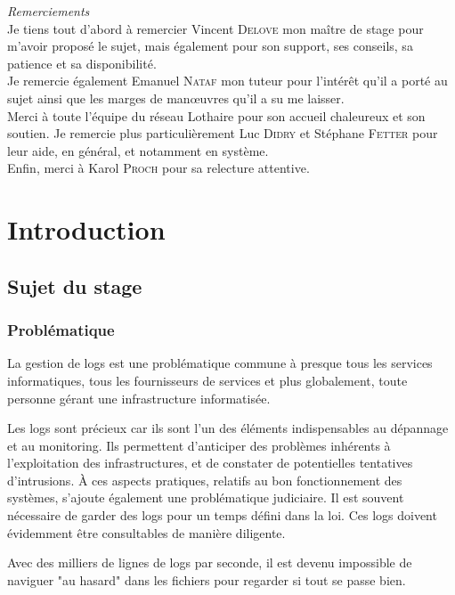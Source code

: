 \documentclass[a4paper,12pt,one side,titlepage]{report}
\begin{document}




\emph{\Large Remerciements}
\\[2cm]
Je tiens tout d'abord à remercier Vincent \textsc{Delove} mon maître de stage pour 
m'avoir proposé le sujet, mais également pour son support, ses conseils, sa patience
et sa disponibilité.
\\[2cm]
Je remercie également Emanuel \textsc{Nataf} mon tuteur pour l'intérêt qu'il a porté au 
sujet ainsi que les marges de manœuvres qu'il a su me laisser.
\\[1cm]
Merci à toute l'équipe du réseau Lothaire pour son accueil chaleureux et son soutien.
Je remercie plus particulièrement  Luc \textsc{Didry} et Stéphane \textsc{Fetter} pour leur
aide, en général, et  notamment en système.
\\[1cm]
Enfin, merci à Karol \textsc{Proch} pour sa relecture attentive.
\setcounter{tocdepth}{1}
\tableofcontents

\part{Introduction}

\chapter{Sujet du stage}
\section{Problématique}
La gestion de \gls{logs} est une problématique commune à presque tous les services informatiques,
tous les fournisseurs de services et plus globalement, toute personne gérant une infrastructure 
informatisée.

Les \gls{logs} sont précieux car ils sont l'un des éléments indispensables au dépannage 
et au monitoring. Ils permettent d'anticiper des problèmes inhérents à l'exploitation 
des infrastructures, et  de constater de potentielles tentatives d'intrusions.
À ces aspects pratiques, relatifs au bon fonctionnement des systèmes, s'ajoute également
une problématique judiciaire. Il est souvent nécessaire de garder des logs pour un 
temps défini  dans la loi. Ces logs doivent évidemment être consultables de manière
diligente.

Avec des milliers de lignes de logs par seconde, il est devenu impossible de naviguer
"au hasard" dans les fichiers pour regarder si tout se passe bien.
\end{document}
